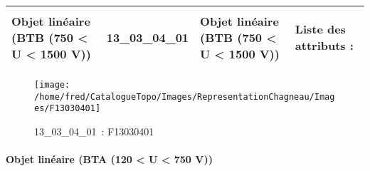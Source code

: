 \documentclass[12pt,titlepage,oneside]{book}
\begin{document}
\renewcommand{\arraystretch}{1.2}
\begin{supertabular}{|p{10cm}|c|p{13cm}|p{12cm}|}
 Objet linéaire (BTB (750 < U < 1500 V)) & 13\_03\_04\_01 & Objet linéaire (BTB (750 < U < 1500 V)) & Liste des attributs :
\begin{enumerate}
\end{enumerate}
\\
\hline
\end{supertabular}
\begin{figure}[h!]
  \hfill         %
  \begin{minipage}[t]{3cm}
    \begin{center}
      \texttt{[image: /home/fred/CatalogueTopo/Images/RepresentationChagneau/Images/F13030401]}
      \caption[~13\_03\_04\_01]{\small{13\_03\_04\_01~:} \tiny{F13030401}}\label{F13030401}
    \end{center}
  \end{minipage}
\end{figure}


\paragraph{Objet linéaire (BTA (120 < U < 750 V))}
\noindent
\vspace{\baselineskip}
\end{document}
